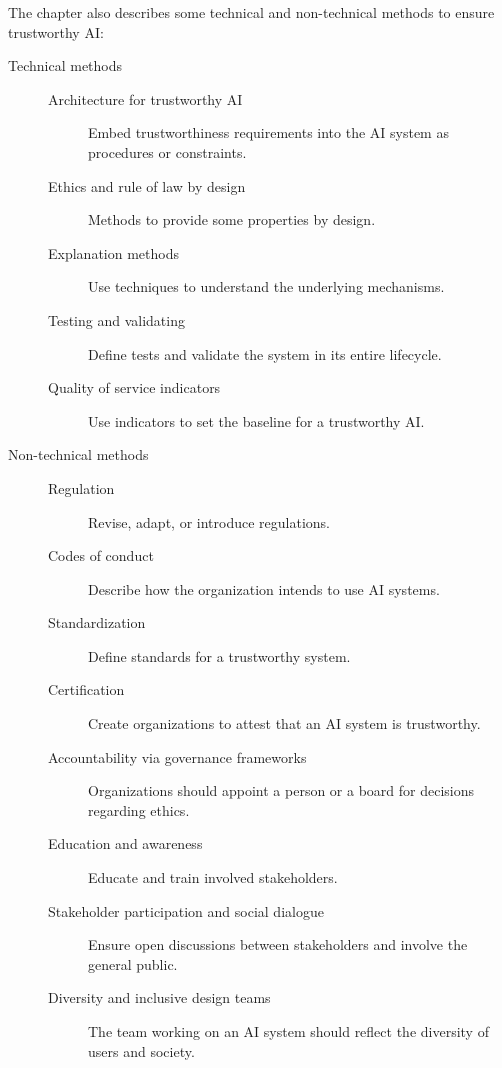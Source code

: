 The chapter also describes some technical and non-technical methods to ensure trustworthy AI:
\begin{description}
    \item[Technical methods] 
        \begin{description}
            \item[Architecture for trustworthy AI] 
                Embed trustworthiness requirements into the AI system as procedures or constraints.

            \item[Ethics and rule of law by design] 
                Methods to provide some properties by design.

            \item[Explanation methods] 
                Use techniques to understand the underlying mechanisms.

            \item[Testing and validating] 
                Define tests and validate the system in its entire lifecycle.

            \item[Quality of service indicators] 
                Use indicators to set the baseline for a trustworthy AI.
        \end{description}


    \item[Non-technical methods] 
        \begin{description}
            \item[Regulation] 
                Revise, adapt, or introduce regulations.

            \item[Codes of conduct] 
                Describe how the organization intends to use AI systems.

            \item[Standardization] 
                Define standards for a trustworthy system.

            \item[Certification] 
                Create organizations to attest that an AI system is trustworthy.

            \item[Accountability via governance frameworks] 
                Organizations should appoint a person or a board for decisions regarding ethics.

            \item[Education and awareness] 
                Educate and train involved stakeholders.

            \item[Stakeholder participation and social dialogue] 
                Ensure open discussions between stakeholders and involve the general public.

            \item[Diversity and inclusive design teams] 
                The team working on an AI system should reflect the diversity of users and society.
        \end{description}
\end{description}



